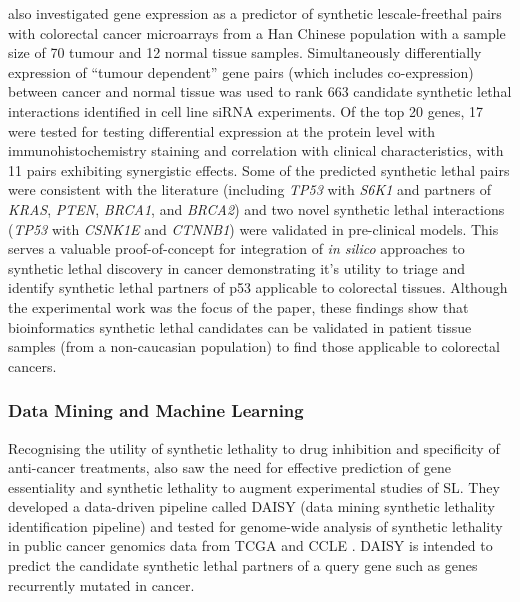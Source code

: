 \citet{Tiong2014} also investigated gene expression as a predictor of synthetic lescale-freethal pairs with colorectal cancer microarrays from a Han Chinese population with a sample size of 70 tumour and 12 normal tissue samples. Simultaneously differentially expression of ``tumour dependent'' gene pairs (which includes co-expression) between cancer and normal tissue was used to rank 663 candidate synthetic lethal interactions identified in cell line siRNA experiments. Of the top 20 genes, 17 were tested for testing differential expression at the protein level with immunohistochemistry staining and correlation with clinical characteristics, with 11 pairs exhibiting synergistic effects. Some of the predicted synthetic lethal pairs were consistent with the literature (including \textit{TP53} with \textit{S6K1} and partners of \textit{KRAS},  \textit{PTEN}, \textit{BRCA1}, and \textit{BRCA2}) and two novel synthetic lethal interactions (\textit{TP53} with \textit{CSNK1E} and \textit{CTNNB1}) were validated in pre-clinical models. This serves a valuable proof-of-concept for integration of \textit{in silico} approaches to synthetic lethal discovery in cancer demonstrating it's utility to triage and identify synthetic lethal partners of p53 applicable to colorectal tissues. Although the experimental work was the focus of the paper, these findings show that bioinformatics synthetic lethal candidates can be validated in patient tissue samples (from a non-caucasian population) to find those applicable to colorectal cancers.

\subsubsection{Data Mining and Machine Learning}

Recognising the utility of synthetic lethality to drug inhibition and specificity of anti-cancer treatments, \citet{Jerby2014} also saw the need for effective prediction of gene essentiality and synthetic lethality to augment experimental studies of SL. They developed a data-driven pipeline called DAISY (data mining synthetic lethality identification pipeline) and tested for genome-wide analysis of synthetic lethality in public cancer genomics data from TCGA and CCLE  \citep{Barretina2012}. DAISY is intended to predict the candidate synthetic lethal partners of a query gene such as genes recurrently mutated in cancer.  


